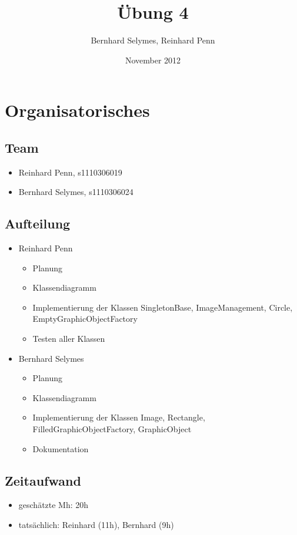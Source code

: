 \documentclass[12pt,a4paper]{article}
\begin{document}
\title{Übung 4}
\author{Bernhard Selymes, Reinhard Penn}
\date{November 2012}

\normalsize

\newcommand{\CodePath}{../ImageProcessing/ImageProcessing/}

\section{Organisatorisches}

\subsection{Team}
	\begin {itemize} 
		\item Reinhard Penn, s1110306019 
		\item Bernhard Selymes, s1110306024
	\end {itemize}

\subsection{Aufteilung}
	\begin {itemize} 
		\item Reinhard Penn
			\begin {itemize}
				\item Planung
				\item Klassendiagramm
				\item Implementierung der Klassen SingletonBase, ImageManagement, Circle, EmptyGraphicObjectFactory
				\item Testen aller Klassen
			\end {itemize}
		\item Bernhard Selymes
			\begin {itemize}
				\item Planung
				\item Klassendiagramm
				\item Implementierung der Klassen Image, Rectangle, FilledGraphicObjectFactory, GraphicObject
				\item Dokumentation			
			\end {itemize}
	\end {itemize}


\subsection{Zeitaufwand}
	\begin {itemize}
		\item geschätzte Mh: 20h
		\item tatsächlich: Reinhard (11h), Bernhard  (9h)
	\end {itemize}
\end{document}
